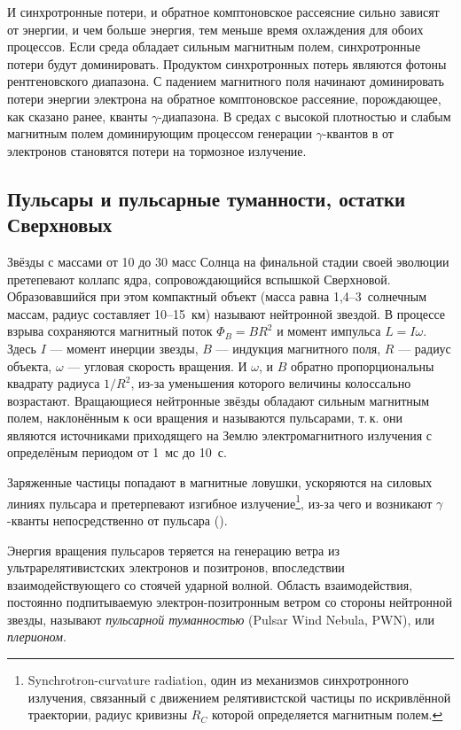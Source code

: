 \documentclass[magd,floatypics,numeref]{msudipl} %
\begin{document}
И синхротронные потери, и обратное комптоновское рассеясние сильно зависят от энергии, и чем больше энергия, тем меньше время охлаждения для обоих процессов.  Если среда обладает сильным магнитным полем, синхротронные потери будут доминировать. Продуктом синхротронных потерь являются фотоны рентгеновского диапазона. С падением магнитного поля начинают доминировать потери энергии электрона на обратное комптоновское рассеяние, порождающее, как сказано ранее, кванты $\gamma$-диапазона. 
В средах с высокой плотностью и слабым магнитным полем доминирующим процессом генерации $\gamma$-квантов в от электронов становятся потери на тормозное излучение. 
\subsection{Пульсары и пульсарные туманности, остатки Сверхновых}
Звёзды с массами от 10 до 30 масс Солнца на финальной стадии своей эволюции претепевают коллапс ядра, сопровождающийся вспышкой Сверхновой. Образовавшийся при этом компактный объект (масса равна 1,4--3~солнечным массам, радиус составляет 10--15~км) называют нейтронной звездой. В процессе взрыва сохраняются магнитный поток $\Phi_B=BR^2$ и момент импульса $L = I\omega$. Здесь $I$ --- момент инерции звезды, $B$ --- индукция магнитного поля, $R$ --- радиус объекта, $\omega$ --- угловая скорость вращения. И $\omega$, и $B$ обратно пропорциональны квадрату радиуса $1/R^2$, из-за уменьшения которого  величины колоссально возрастают. Вращающиеся нейтронные звёзды обладают сильным магнитным полем, наклонённым к оси вращения и называются пульсарами, т.\,к. они являются источниками приходящего на Землю электромагнитного излучения с определёным периодом от 1~мс до 10~с. 

Заряженные частицы попадают в магнитные ловушки, ускоряются на силовых линиях пульсара и претерпевают изгибное излучение\footnote{Synchrotron-curvature radiation, один из механизмов синхротронного излучения, связанный с движением релятивистской частицы по искривлённой траектории, радиус кривизны $R_C$ которой определяется магнитным полем.}, из-за чего и возникают $\gamma$-кванты непосредственно от пульсара (\autocite{doi:10.1126/science.1164718}). 

Энергия вращения пульсаров теряется на генерацию ветра из ультрарелятивистских электронов и позитронов, впоследствии взаимодействующего со стоячей ударной волной. Область взаимодействия, постоянно подпитываемую электрон-позитронным ветром со стороны нейтронной звезды, называют \textit{пульсарной туманностью} (Pulsar Wind Nebula, PWN), или \textit{плерионом}.
\end{document}

